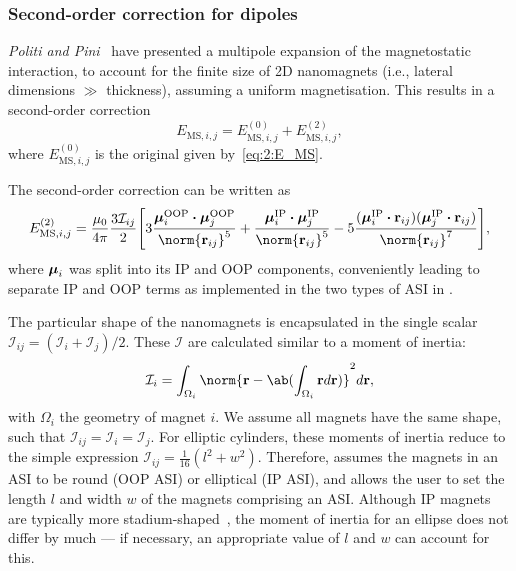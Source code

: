 \subsubsection{Second-order correction for dipoles}
\textit{Politi and Pini}~\cite{Dipolar2Dparticles} have presented a multipole expansion of the magnetostatic interaction, to account for the finite size of 2D nanomagnets (i.e., lateral dimensions $\gg$ thickness), assuming a uniform magnetisation.
This results in a second-order correction
\begin{equation}
	E_{\mathrm{MS},i,j} = E_{\mathrm{MS},i,j}^\mathrm{(0)} + E_{\mathrm{MS},i,j}^\mathrm{(2)} \mathrm{,}
\end{equation}
where $E_{\mathrm{MS},i,j}^\mathrm{(0)}$ is the original   given by~\cref{eq:2:E_MS}. \par
The second-order correction can be written as
\begin{equation}
	\label{eq:2:E_MS_order2}
	E_{\mathrm{MS},i,j}^\mathrm{(2)} = \frac{\mu_0}{4\pi} \frac{3\mathcal{I}_{ij}}{2} \Bigg[3\frac{\vc{\mu}_i^\mathrm{OOP} \bcdot \vc{\mu}_j^\mathrm{OOP}}{\norm{\vc{r}_{ij}}^5} + \frac{\vc{\mu}_i^\mathrm{IP} \bcdot \vc{\mu}_j^\mathrm{IP}}{\norm{\vc{r}_{ij}}^5} -5\frac{(\vc{\mu}_i^\mathrm{IP} \bcdot \vc{r}_{ij}) (\vc{\mu}_j^\mathrm{IP} \bcdot \vc{r}_{ij})}{\norm{\vc{r}_{ij}}^7} \Bigg] \mathrm{,}
\end{equation}
where $\boldsymbol{\mathbf{\mu}}_i$ was split into its IP and OOP components, conveniently leading to separate IP and OOP terms as implemented in the two types of ASI in \hotspice. \par
The particular shape of the nanomagnets is encapsulated in the single scalar $\mathcal{I}_{ij} = (\mathcal{I}_i + \mathcal{I}_j)/2$.
These $\mathcal{I}$ are calculated similar to a moment of inertia:
\begin{equation}
	\mathcal{I}_i = \int_{\Omega_i} \norm{\vc{r} - \ab(\int_{\Omega_i} \vc{r} d\vc{r})}^2 d\vc{r} \mathrm{,}
\end{equation}
with $\Omega_i$ the geometry of magnet $i$.
We assume all magnets have the same shape, such that $\mathcal{I}_{ij} = \mathcal{I}_i = \mathcal{I}_j$.
For elliptic cylinders, these moments of inertia reduce to the simple expression $\mathcal{I}_{ij} = \frac{1}{16}(l^2 + w^2)$.
Therefore, \hotspice assumes the magnets in an ASI to be round (OOP ASI) or elliptical (IP ASI), and allows the user to set the length $l$ and width $w$ of the magnets comprising an ASI.
Although IP magnets are typically more stadium-shaped~\cite{EmergentChiralityRatchet,clocking-protocol}, the moment of inertia for an ellipse does not differ by much --- if necessary, an appropriate value of $l$ and $w$ can account for this.

